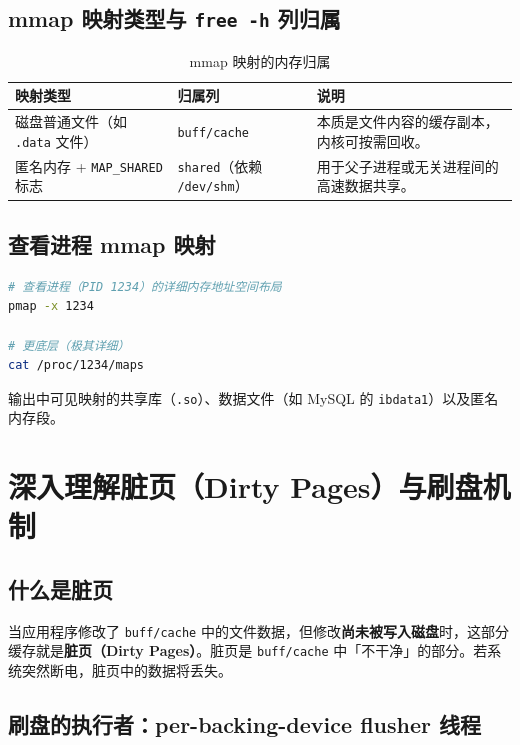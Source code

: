 \section{mmap 映射类型与 \texttt{free -h} 列归属}

\begin{table}[htbp]
\centering
\caption{mmap 映射的内存归属}
\begin{tabular}{@{}p{4cm} p{4cm} p{6cm}@{}}
\toprule
\textbf{映射类型} & \textbf{归属列} & \textbf{说明} \\
\midrule
磁盘普通文件（如 \texttt{.data} 文件） & \texttt{buff/cache} & 本质是文件内容的缓存副本，内核可按需回收。 \\
\addlinespace
匿名内存 + \texttt{MAP\_SHARED} 标志 & \texttt{shared}（依赖 \texttt{/dev/shm}） & 用于父子进程或无关进程间的高速数据共享。 \\
\bottomrule
\end{tabular}
\end{table}

\section{查看进程 mmap 映射}

\begin{lstlisting}[language=bash]
# 查看进程（PID 1234）的详细内存地址空间布局
pmap -x 1234

# 更底层（极其详细）
cat /proc/1234/maps
\end{lstlisting}

输出中可见映射的共享库（\texttt{.so}）、数据文件（如 MySQL 的 \texttt{ibdata1}）以及匿名内存段。


\chapter{深入理解脏页（Dirty Pages）与刷盘机制}

\section{什么是脏页}

当应用程序修改了 \texttt{buff/cache} 中的文件数据，但修改\textbf{尚未被写入磁盘}时，这部分缓存就是\textbf{脏页（Dirty Pages）}。脏页是 \texttt{buff/cache} 中「不干净」的部分。若系统突然断电，脏页中的数据将丢失。

\section{刷盘的执行者：per-backing-device flusher 线程}


